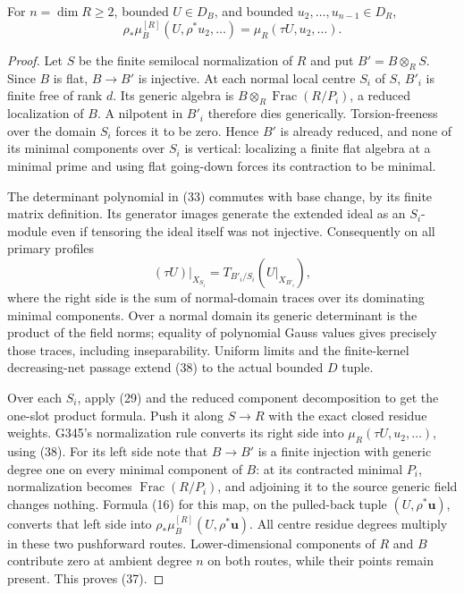 \begin{theorem}
For \(n=\dim R\geq2\), bounded \(U\in D_B\), and bounded
\(u_2,\ldots,u_{n-1}\in D_R\),
\[
 \rho_*\mu_B^{[R]}(U,\rho^*u_2,\ldots)
                =\mu_R(\tau U,u_2,\ldots).                   \tag{37}
\]
\end{theorem}
\begin{proof}
Let \(S\) be the finite semilocal normalization of \(R\) and
put \(B'=B\otimes_R S\). Since \(B\) is flat, \(B\to B'\)
is injective. At each normal local centre \(S_i\) of \(S\),
\(B'_i\) is finite free of rank \(d\).
Its generic algebra is
\(B\otimes_R\operatorname{Frac}(R/P_i)\), a reduced
localization of \(B\). A nilpotent in \(B'_i\) therefore
dies generically. Torsion-freeness over the domain \(S_i\)
forces it to be zero. Hence \(B'\) is already reduced,
and none of its minimal components over \(S_i\) is vertical:
localizing a finite flat algebra at a minimal prime and
using flat going-down forces its contraction to be minimal.

The determinant polynomial in (33) commutes with base change,
by its finite matrix definition. Its generator images generate
the extended ideal as an \(S_i\)-module even if tensoring the
ideal itself was not injective. Consequently on all primary
profiles
\[
 (\tau U)|_{X_{S_i}}
       =T_{B'_i/S_i}(U|_{X_{B'_i}}),                          \tag{38}
\]
where the right side is the sum of normal-domain traces
over its dominating minimal components.
Over a normal domain its generic determinant is the product
of the field norms; equality of polynomial Gauss values
gives precisely those traces, including inseparability.
Uniform limits and the finite-kernel decreasing-net passage
extend (38) to the actual bounded \(D\) tuple.

Over each \(S_i\), apply (29) and the reduced component
decomposition to get the one-slot product formula.
Push it along \(S\to R\) with the exact closed residue
weights. G345's normalization rule converts its right
side into \(\mu_R(\tau U,u_2,\ldots)\), using (38).
For its left side note that \(B\to B'\) is a finite
injection with generic degree one on every minimal
component of \(B\): at its contracted minimal \(P_i\),
normalization becomes \(\operatorname{Frac}(R/P_i)\),
and adjoining it to the source generic field changes
nothing. Formula (16) for this map, on the pulled-back
tuple \((U,\rho^*\boldsymbol u)\), converts that left
side into \(\rho_*\mu_B^{[R]}(U,\rho^*\boldsymbol u)\).
All centre residue degrees multiply in these two
pushforward routes. Lower-dimensional components of
\(R\) and \(B\) contribute zero at ambient degree \(n\)
on both routes, while their points remain present.
This proves (37).
\end{proof}

